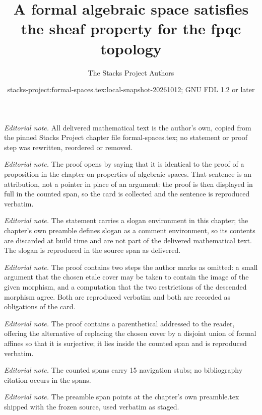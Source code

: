 \documentclass{stacks-project}
\title{A formal algebraic space satisfies the sheaf property for the fpqc topology}
\author{The Stacks Project Authors}
\date{stacks-project:formal-spaces.tex:local-snapshot-20261012; GNU FDL 1.2 or later}
\theoremstyle{plain}
\theoremstyle{definition}
\theoremstyle{remark}
\numberwithin{equation}{subsection}
\begin{document}
\maketitle
\noindent\textit{Editorial note.} All delivered mathematical text is the author's own, copied from the pinned Stacks Project chapter file formal-spaces.tex; no statement or proof step was rewritten, reordered or removed.\par\medskip
\noindent\textit{Editorial note.} The proof opens by saying that it is identical to the proof of a proposition in the chapter on properties of algebraic spaces. That sentence is an attribution, not a pointer in place of an argument: the proof is then displayed in full in the counted span, so the card is collected and the sentence is reproduced verbatim.\par\medskip
\noindent\textit{Editorial note.} The statement carries a slogan environment in this chapter; the chapter's own preamble defines slogan as a comment environment, so its contents are discarded at build time and are not part of the delivered mathematical text. The slogan is reproduced in the source span as delivered.\par\medskip
\noindent\textit{Editorial note.} The proof contains two steps the author marks as omitted: a small argument that the chosen etale cover may be taken to contain the image of the given morphism, and a computation that the two restrictions of the descended morphism agree. Both are reproduced verbatim and both are recorded as obligations of the card.\par\medskip
\noindent\textit{Editorial note.} The proof contains a parenthetical addressed to the reader, offering the alternative of replacing the chosen cover by a disjoint union of formal affines so that it is surjective; it lies inside the counted span and is reproduced verbatim.\par\medskip
\noindent\textit{Editorial note.} The counted spans carry 15 navigation stubs; no bibliography citation occurs in the spans.\par\medskip
\noindent\textit{Editorial note.} The preamble span points at the chapter's own preamble.tex shipped with the frozen source, used verbatim as staged.\par\medskip
\end{document}
